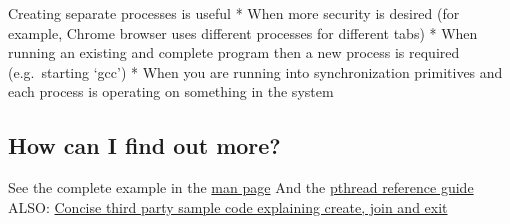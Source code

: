 Creating separate processes is useful * When more security is desired (for example, Chrome browser uses different processes for different tabs) * When running an existing and complete program then a new process is required (e.g.~starting `gcc') * When you are running into synchronization primitives and each process is operating on something in the system

\subsection{How can I find out more?}\label{how-can-i-find-out-more}

See the complete example in the \href{http://man7.org/linux/man-pages/man3/pthread_create.3.html}{man page} And the \href{http://man7.org/linux/man-pages/man7/pthreads.7.html}{pthread reference guide} ALSO: \href{http://www.thegeekstuff.com/2012/04/terminate-c-thread/}{Concise third party sample code explaining create, join and exit}


